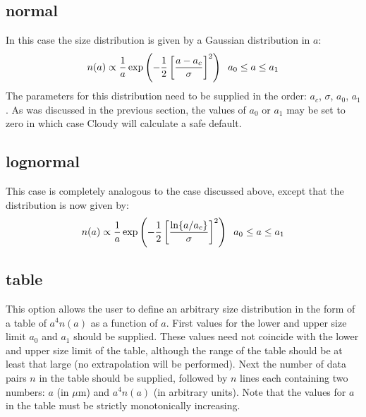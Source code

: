\subsection{normal}
In this case the size distribution is given by a Gaussian distribution in $a$:
\[ n(a) \propto \frac{1}{a} \exp \left( -\frac{1}{2} \left[ \frac{a -
      a_c}{\sigma} \right]^2 \right) \hspace{2mm} a_0 \leq a \leq a_1 \] The
parameters for this distribution need to be supplied in the order: $a_c$,
$\sigma$, $a_0$, $a_1$. As was discussed in the previous section, the values
of $a_0$ or $a_1$ may be set to zero in which case Cloudy will calculate a
safe default.
\subsection{lognormal}
This case is completely analogous to the  case discussed
above, except that the distribution is now given by:
\[ n(a) \propto \frac{1}{a} \exp \left( -\frac{1}{2} \left[
    \frac{\ln\{a/a_c\}}{\sigma} \right]^2 \right) \hspace{2mm} a_0 \leq a \leq
a_1 \]
\subsection{table}
\label{sdtable}
This option allows the user to define an arbitrary size distribution in the
form of a table of $a^4 n(a)$ as a function of $a$. First values for the lower
and upper size limit $a_0$ and $a_1$ should be supplied. These values need not
coincide with the lower and upper size limit of the table, although the range
of the table should be at least that large (no extrapolation will be
performed). Next the number of data pairs $n$ in the table should be supplied,
followed by $n$ lines each containing two numbers: $a$ (in $\mu$m) and $a^4
n(a)$ (in arbitrary units). Note that the values for $a$ in the table must be
strictly monotonically increasing.
